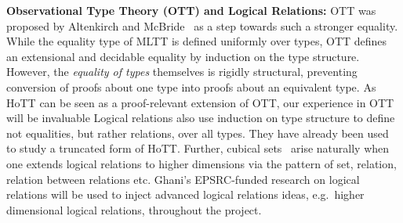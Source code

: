 \documentclass[a4paper,11pt]{article}
\newcommand{\eg}{{e.g.}\ }
\begin{document}
{\bf Observational Type Theory (OTT) and Logical Relations:} OTT was
proposed by Altenkirch and McBride~\cite{alti:ott-conf} as a step
towards such a stronger equality. While the equality type of MLTT is
defined uniformly over types, OTT defines an extensional and
decidable equality by induction on the type structure. However, the
{\em equality of types} themselves is rigidly structural, preventing 
conversion of proofs about one type into proofs about an equivalent type. As
HoTT can be seen as a proof-relevant extension of OTT, our experience
in OTT will be invaluable
Logical relations also use induction on type structure
to define not equalities, but rather relations, over all
types. They have already been
used~\cite{licataHarper:canonicity2d} to study a truncated form of
HoTT. Further, cubical sets~\cite{BezemM:cubsmt} 
arise naturally when one extends logical
relations to higher dimensions via the pattern of set, relation,
relation between relations etc. Ghani's EPSRC-funded research on
logical relations will be used to inject advanced logical relations
ideas, \eg higher dimensional logical relations, throughout
the project.



\end{document}
